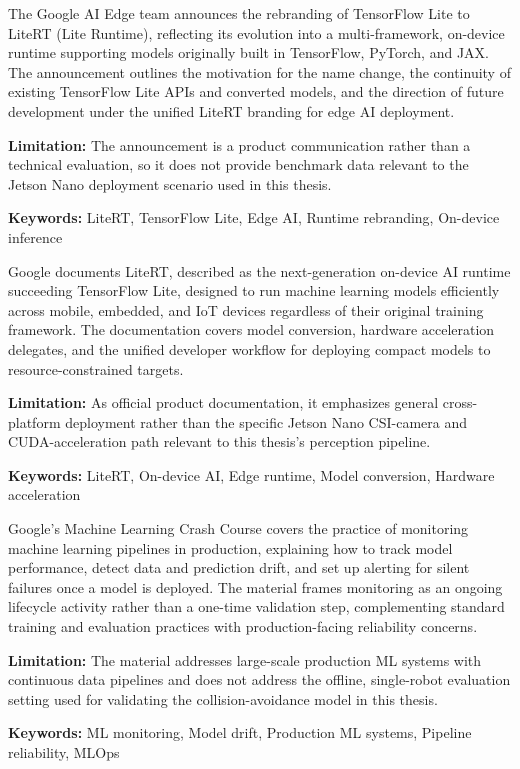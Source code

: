 {
	The Google AI Edge team \cite{Google:2024a} announces the rebranding of TensorFlow Lite to LiteRT (Lite Runtime), reflecting its evolution into a multi-framework, on-device runtime supporting models originally built in TensorFlow, PyTorch, and JAX. The announcement outlines the motivation for the name change, the continuity of existing TensorFlow Lite APIs and converted models, and the direction of future development under the unified LiteRT branding for edge AI deployment.
	
	\bigskip
	\textbf{Limitation:} The announcement is a product communication rather than a technical evaluation, so it does not provide benchmark data relevant to the Jetson Nano deployment scenario used in this thesis.
	
	\scriptsize{\textbf{Keywords:} LiteRT, TensorFlow Lite, Edge AI, Runtime rebranding, On-device inference}
}

{
	Google \cite{Google:2026} documents LiteRT, described as the next-generation on-device AI runtime succeeding TensorFlow Lite, designed to run machine learning models efficiently across mobile, embedded, and IoT devices regardless of their original training framework. The documentation covers model conversion, hardware acceleration delegates, and the unified developer workflow for deploying compact models to resource-constrained targets.
	
	\bigskip
	\textbf{Limitation:} As official product documentation, it emphasizes general cross-platform deployment rather than the specific Jetson Nano CSI-camera and CUDA-acceleration path relevant to this thesis's perception pipeline.
	
	\scriptsize{\textbf{Keywords:} LiteRT, On-device AI, Edge runtime, Model conversion, Hardware acceleration}
}

{
	Google's Machine Learning Crash Course \cite{Google:2024} covers the practice of monitoring machine learning pipelines in production, explaining how to track model performance, detect data and prediction drift, and set up alerting for silent failures once a model is deployed. The material frames monitoring as an ongoing lifecycle activity rather than a one-time validation step, complementing standard training and evaluation practices with production-facing reliability concerns.
	
	\bigskip
	\textbf{Limitation:} The material addresses large-scale production ML systems with continuous data pipelines and does not address the offline, single-robot evaluation setting used for validating the collision-avoidance model in this thesis.
	
	\scriptsize{\textbf{Keywords:} ML monitoring, Model drift, Production ML systems, Pipeline reliability, MLOps}
}

